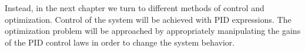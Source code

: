Instead, in the next chapter we turn to different methods of control and optimization. Control of the system will be achieved with PID expressions. The optimization problem will be approached by appropriately manipulating the gains of the PID control laws in order to change the system behavior.









